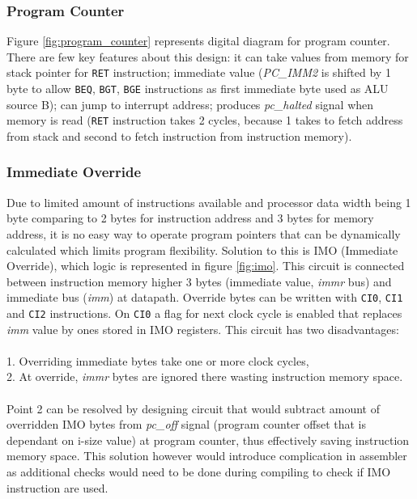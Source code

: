 \documentclass[a4paper,12pt]{article}
\begin{document}
\begin{multicols}{2}

\subsubsection{Program Counter} \label{sec:pc}
Figure \ref{fig:program_counter} represents digital diagram for program counter. There are few key features about this design: it can take values from memory for stack pointer for \texttt{RET} instruction; immediate value (\textit{PC\_IMM2} is shifted by 1 byte to allow \texttt{BEQ}, \texttt{BGT}, \texttt{BGE} instructions as first immediate byte used as ALU source B); can jump to interrupt address; produces \textit{pc\_halted} signal when memory is read (\texttt{RET} instruction takes 2 cycles, because 1 takes to fetch address from stack and second to fetch instruction from instruction memory).


\subsubsection{Immediate Override} \label{sec:imo}
Due to limited amount of instructions available and processor data width being 1 byte comparing to 2 bytes for instruction address and 3 bytes for memory address, it is no easy way to operate program pointers that can be dynamically calculated which limits program flexibility. Solution to this is IMO (Immediate Override), which logic is represented in figure \ref{fig:imo}. This circuit is connected between instruction memory higher 3 bytes (immediate value, \textit{immr} bus) and immediate bus (\textit{imm}) at datapath. Override bytes can be written with \texttt{CI0}, \texttt{CI1} and \texttt{CI2} instructions. On \texttt{CI0} a flag for next clock cycle is enabled that replaces \textit{imm} value by ones stored in IMO registers. This circuit has two disadvantages: \\
\\
1. Overriding immediate bytes take one or more clock cycles,\\
2. At override, \textit{immr} bytes are ignored there wasting instruction memory space.\\
\\
Point 2 can be resolved by designing circuit that would subtract amount of overridden IMO bytes from \textit{pc\_off} signal (program counter offset that is dependant on i-size value) at program counter, thus effectively saving instruction memory space. This solution however would introduce complication in assembler as additional checks would need to be done during compiling to check if IMO instruction are used.
\end{multicols}
\end{document}
